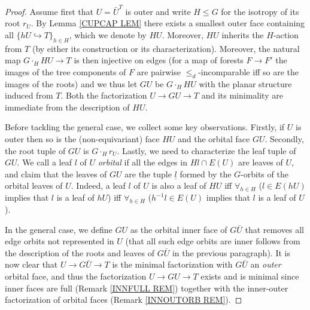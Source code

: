 \documentclass[a4paper,10pt
,draft
]{article}%
\begin{document}
\begin{proof}
Assume first that $U=\bar{U}^T$ is outer and write $H\leq G$ for
the isotropy of its root $r_U$.
By Lemma \ref{CUPCAP LEM} there exists a smallest outer face 
containing all $\{h U \hookrightarrow T\}_{h \in H}$,
which we denote by $HU$.
Moreover, $HU$ inherits the $H$-action from $T$ 
(by either its construction or its characterization).
Moreover, the natural map
$G \cdot_H HU \to T$
is then injective on edges
(for a map of forests $F \to F'$
the images of the tree components of $F$ are pairwise $\leq_d$-incomparable iff so are the images of the roots)
and we thus let $GU$ be $G \cdot_H HU$
with the planar structure induced from $T$.
Both the factorization $U \to GU \to T$ and its minimality are immediate from the description of $HU$.

	Before tackling the general case, we collect some key observations.
	Firstly, if $U$ is outer then so is the (non-equivariant) face $HU$ and the orbital face $GU$.
	Secondly, the root tuple of 
	$GU$ is $G\cdot_H r_U$.
	Lastly, we need to characterize the leaf tuple of $GU$. We call a leaf $l$ of $U$ \textit{orbital} if 
all the edges in $Hl \cap E(U)$ are leaves of $U$, 
	and claim that the leaves of $GU$ are the tuple $\underline{l}$ formed by the $G$-orbits of the orbital leaves of $U$. 
	Indeed, a leaf $l$ of $U$ is also a leaf of $HU$ iff 
	$\forall_{h \in H}$ ($l \in E(hU)$ implies that $l$ is a leaf of $hU$) iff
	$\forall_{h \in H}$ ($h^{-1} l \in E(U)$ implies that $l$ is a leaf of $U$).
	
	In the general case, we define $GU$ as the orbital inner face of $G \bar{U}$ that removes all edge orbits not represented in $U$ 	(that all such edge orbits are inner follows from the description of the roots and leaves of $G\bar{U}$ in the previous paragraph). 
	It is now clear that $U \to G\bar{U} \to T$ is the minimal factorization with $G\bar{U}$ an \textit{outer} orbital face,
	and thus the factorization
	$U \to GU \to T$ exists and is minimal
	since inner faces are full (Remark \ref{INNFULL REM})
	together with the inner-outer factorization of
	orbital faces (Remark \ref{INNOUTORB REM}).
\end{proof}
\end{document}
